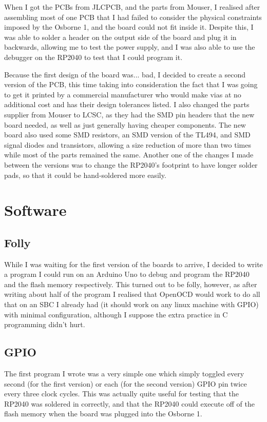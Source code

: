 \documentclass[a4paper]{article}
\begin{document}
When I got the PCBs from JLCPCB, and the parts from Mouser, I realised
after assembling most of one PCB that I had failed to consider the
physical constraints imposed by the Osborne 1, and the board could not
fit inside it. Despite this, I was able to solder a header on the
output side of the board and plug it in backwards, allowing me to test
the power supply, and I was also able to use the debugger on the
RP2040 to test that I could program it.

Because the first design of the board was... bad, I decided to create
a second version of the PCB, this time taking into consideration the fact
that I was going to get it printed by a commercial manufacturer who
would make vias at no additional cost and has their design tolerances
listed. I also changed the parts supplier from Mouser to LCSC, as they
had the SMD pin headers that the new board needed, as well as just
generally having cheaper components. The new board also used some SMD
resistors, an SMD version of the TL494, and SMD signal diodes and
transistors, allowing a size reduction of more than two times while
most of the parts remained the same. Another one of the changes I made
between the versions was to change the RP2040's footprint to have
longer solder pads, so that it could be hand-soldered more easily.

\section{Software}

\subsection{Folly}

While I was waiting for the first version of the boards to arrive, I
decided to write a program I could run on an Arduino Uno to debug and
program the RP2040 and the flash memory respectively. This turned
out to be folly, however, as after writing about half of the program I
realised that OpenOCD would work to do all that on an SBC I already had (it should
work on any linux machine with GPIO) with minimal configuration,
although I suppose the extra practice in C programming didn't hurt.

\subsection{GPIO}

The first program I wrote was a very simple one which simply toggled
every second (for the first version) or each (for the second version)
GPIO pin twice every three clock cycles. This was actually quite
useful for testing that the RP2040 was soldered in correctly, and that
the RP2040 could execute off of the flash memory when the board was
plugged into the Osborne 1.
\end{document}
